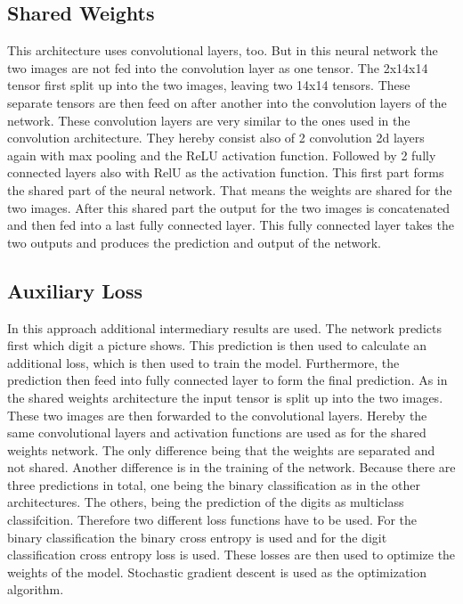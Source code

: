 \documentclass[12pt]{article}
\begin{document}
\subsection{Shared Weights}
This architecture uses convolutional layers, too.
But in this neural network the two images are not fed into the convolution layer as one tensor.
The 2x14x14 tensor first split up into the two images, leaving two 14x14 tensors.
These separate tensors are then feed on after another into the convolution layers of the network.
These convolution layers are very similar to the ones used in the convolution architecture.
They hereby consist also of 2 convolution 2d layers again with max pooling and the ReLU activation function.
Followed by 2 fully connected layers also with RelU as the activation function.
This first part forms the shared part of the neural network.
That means the weights are shared for the two images.
After this shared part the output for the two images is concatenated and then fed into a last fully connected layer.
This fully connected layer takes the two outputs and produces the prediction and output of the network.
\subsection{Auxiliary Loss}
In this approach additional intermediary results are used.
The network predicts first which digit a picture shows.
This prediction is then used to calculate an additional loss, which is then used to train the model.
Furthermore, the prediction then feed into fully connected layer to form the final prediction.
As in the shared weights architecture the input tensor is split up into the two images.
These two images are then forwarded to the convolutional layers.
Hereby the same convolutional layers and activation functions are used as for the shared weights network.
The only difference being that the weights are separated and not shared.
Another difference is in the training of the network.
Because there are three predictions in total, one being the binary classification as in the other architectures.
The others, being the prediction of the  digits as multiclass classifcition.
Therefore two different loss functions have to be used.
For the binary classification the binary cross entropy is used and for the digit classification cross entropy loss is used.
These losses are then used to optimize the weights of the model.
Stochastic gradient descent is used as the optimization algorithm. 
\end{document}
